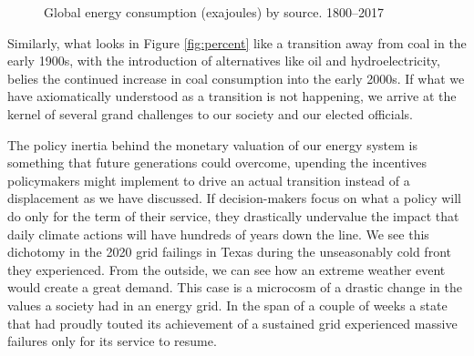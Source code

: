\begin{figure}[!ht]
  \hfill
  \caption{
    Global energy consumption (exajoules) by source. 1800--2017
    \cite{york_energy_2019}}
  \label{fig:percent_total_energy}
\end{figure}

Similarly, what looks in Figure \ref{fig:percent} like a transition away from
coal in the early 1900s, with the introduction of alternatives like oil and
hydroelectricity, belies the continued increase in coal consumption into the
early 2000s. If what we have axiomatically understood as a transition is not
happening, we arrive at the kernel of several grand challenges to our society
and our elected officials.

The policy inertia behind the monetary valuation of our energy system is
something that future generations could overcome, upending the incentives
policymakers might implement to drive an actual transition instead of a
displacement as we have discussed. If decision-makers focus on what a policy
will do only for the term of their service, they drastically undervalue the
impact that daily climate actions will have hundreds of years down the line. We
see this dichotomy in the 2020 grid failings in Texas during the unseasonably
cold front they experienced. From the outside, we can see how an extreme
weather event would create a great demand. This case is a microcosm of a
drastic change in the values a society had in an energy grid. In the span of a
couple of weeks a state that had proudly touted its achievement of a sustained
grid \cite{texas_ercot_nodate} experienced massive failures only for its
service to resume.

